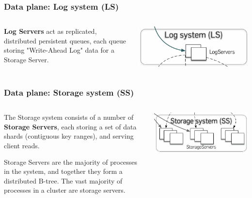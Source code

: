 

\begin{frame}
    \frametitle{Data plane: Log system (LS)}
    \begin{columns}
        \begin{column}{0.5\textwidth}
        \textbf{Log Servers} act as replicated, distributed persistent queues, each queue storing "Write-Ahead Log" data for a Storage Server.
        
        \end{column}
        \begin{column}{0.5\textwidth}
            \centering
            \includegraphics[width=\textwidth]{img/2-Architecture/log system.png}
        \end{column}
    \end{columns}
\end{frame}



\begin{frame}
    \frametitle{Data plane: Storage system (SS)}
    \begin{columns}
        \begin{column}{0.5\textwidth}
        The Storage system consists of a number of \textbf{Storage Servers}, each
storing a set of data shards (contiguous key ranges),
and serving client reads. 
\vspace{0.5cm}

Storage Servers are the majority of processes in the system, and together they form a distributed B-tree.
The vast majority of processes in a cluster are storage servers.
        
        \end{column}
        \begin{column}{0.5\textwidth}
            \centering
            \includegraphics[width=\textwidth]{img/2-Architecture/Storage system.png}
        \end{column}
    \end{columns}
\end{frame}

